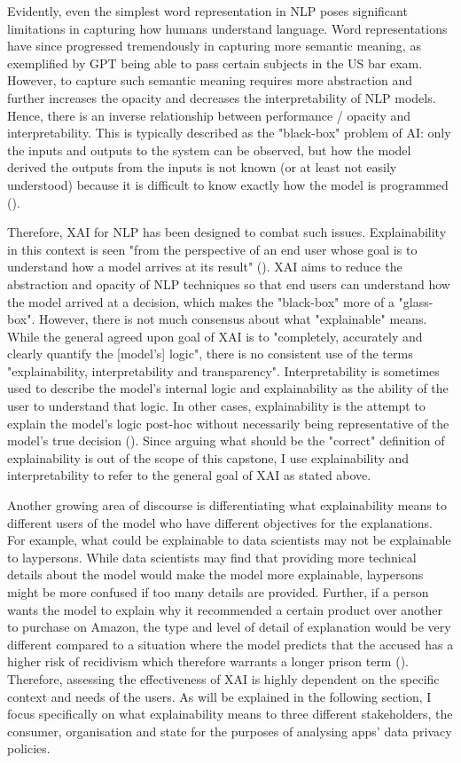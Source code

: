 Evidently, even the simplest word representation in NLP poses significant limitations in capturing how humans understand language. Word representations have since progressed tremendously in capturing more semantic meaning, as exemplified by GPT being able to pass certain subjects in the US bar exam. However, to capture such semantic meaning requires more abstraction and further increases the opacity and decreases the interpretability of NLP models. Hence, there is an inverse relationship between performance / opacity and interpretability.  This is typically described as the "black-box" problem of AI: only the inputs and outputs to the system can be observed, but how the model derived the outputs from the inputs is not known (or at least not easily understood) because it is difficult to know exactly how the model is programmed (\cite{zednik2021}).

Therefore, XAI for NLP has been designed to combat such issues. Explainability in this context is seen "from the perspective of an end user whose goal is to understand how a model arrives at its result" (\cite{danilevsky2020}). XAI aims to reduce the abstraction and opacity of NLP techniques so that end users can understand how the model arrived at a decision, which makes the "black-box" more of a "glass-box". However, there is not much consensus about what "explainable" means. While the general agreed upon goal of XAI is to "completely, accurately and clearly quantify the [model's] logic", there is no consistent use of the terms "explainability, interpretability and transparency". Interpretability is sometimes used to describe the model's internal logic and explainability as the ability of the user to understand that logic. In other cases, explainability is the attempt to explain the model's logic post-hoc without necessarily being representative of the model's true decision (\cite{rosenfeld2021}). Since arguing what should be the "correct" definition of explainability is out of the scope of this capstone, I use explainability and interpretability to refer to the general goal of XAI as stated above.

Another growing area of discourse is differentiating what explainability means to different users of the model who have different objectives for the explanations. For example, what could be explainable to data scientists may not be explainable to laypersons. While data scientists may find that providing more technical details about the model would make the model more explainable, laypersons might be more confused if too many details are provided. Further, if a person wants the model to explain why it recommended a certain product over another to purchase on Amazon, the type and level of detail of explanation would be very different compared to a situation where the model predicts that the accused has a higher risk of recidivism which therefore warrants a longer prison term (\cite{rosenfeld2021}). Therefore, assessing the effectiveness of XAI is highly dependent on the specific context and needs of the users. As will be explained in the following section, I focus specifically on what explainability means to three different stakeholders, the consumer, organisation and state for the purposes of analysing apps' data privacy policies.

